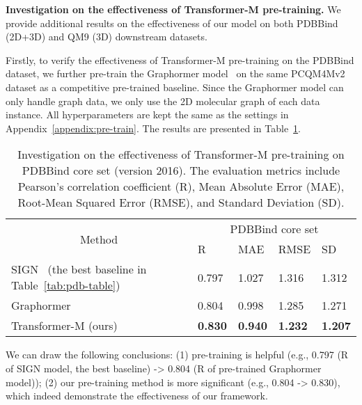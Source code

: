 \documentclass{article} \usepackage[dvipsnames]{xcolor}
\begin{document}
\textbf{Investigation on the effectiveness of Transformer-M pre-training.} We provide additional results on the effectiveness of our model on both PDBBind (2D+3D) and QM9 (3D) downstream datasets. 

Firstly, to verify the effectiveness of Transformer-M pre-training on the PDBBind dataset, we further pre-train the Graphormer model~\citep{ying2021transformers} on the same PCQM4Mv2 dataset as a competitive pre-trained baseline. Since the Graphormer model can only handle graph data, we only use the 2D molecular graph of each data instance. All hyperparameters are kept the same as the settings in Appendix~\ref{appendix:pre-train}. The results are presented in Table~\ref{tab:pdb-more-results}.

\begin{table}[h]
\small
\centering
\caption{Investigation on the effectiveness of Transformer-M pre-training on PDBBind core set (version 2016). The evaluation metrics include Pearson's correlation coefficient (R), Mean Absolute Error (MAE), Root-Mean Squared Error (RMSE), and Standard Deviation (SD).}
\label{tab:pdb-more-results}
\setlength\tabcolsep{5pt}
\addtolength{\tabcolsep}{-2pt}
\begin{tabular}{l|llll}
\toprule
\multicolumn{1}{c|}{\multirow{2}{*}{Method}}                    & \multicolumn{4}{c}{PDBBind core set}                                   \\
\cline{2-5}
\multicolumn{1}{c|}{}                                           & R    & MAE    & RMSE  & SD  \\
\hline
SIGN~\citep{li2021structure} (the best baseline in Table~\ref{tab:pdb-table})                    & 0.797   & 1.027       & 1.316    & 1.312    \\
Graphormer~\citep{ying2021transformers}                     & 0.804   & 0.998       & 1.285    & 1.271    \\
Transformer-M (ours)                                              & \textbf{0.830}              & \textbf{0.940 }                  & \textbf{1.232 }                & \textbf{1.207}\\
\bottomrule
\end{tabular}
\end{table}

We can draw the following conclusions: (1) pre-training is helpful (e.g., 0.797 (R of SIGN model, the best baseline) -> 0.804 (R of pre-trained Graphormer model)); (2) our pre-training method is more significant (e.g., 0.804 -> 0.830), which indeed demonstrate the effectiveness of our framework.
\end{document}
